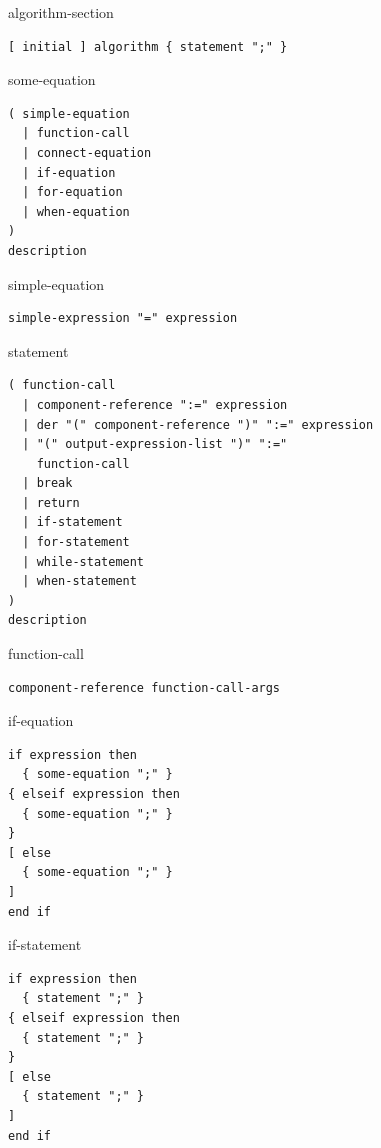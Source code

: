 \begin{production}{algorithm-section}
\begin{lstlisting}
[ initial ] algorithm { statement ";" }
\end{lstlisting}
\end{production}

\begin{production}{some-equation}
\begin{lstlisting}
( simple-equation
  | function-call
  | connect-equation
  | if-equation
  | for-equation
  | when-equation
)
description
\end{lstlisting}
\end{production}

\begin{production}{simple-equation}
\begin{lstlisting}
simple-expression "=" expression
\end{lstlisting}
\end{production}

\begin{production}{statement}
\begin{lstlisting}
( function-call
  | component-reference ":=" expression
  | der "(" component-reference ")" ":=" expression
  | "(" output-expression-list ")" ":="
    function-call
  | break
  | return
  | if-statement
  | for-statement
  | while-statement
  | when-statement
)
description
\end{lstlisting}
\end{production}

\begin{production}{function-call}
\begin{lstlisting}
component-reference function-call-args
\end{lstlisting}
\end{production}

\begin{production}{if-equation}
\begin{lstlisting}
if expression then
  { some-equation ";" }
{ elseif expression then
  { some-equation ";" }
}
[ else
  { some-equation ";" }
]
end if
\end{lstlisting}
\end{production}

\begin{production}{if-statement}
\begin{lstlisting}
if expression then
  { statement ";" }
{ elseif expression then
  { statement ";" }
}
[ else
  { statement ";" }
]
end if
\end{lstlisting}
\end{production}


